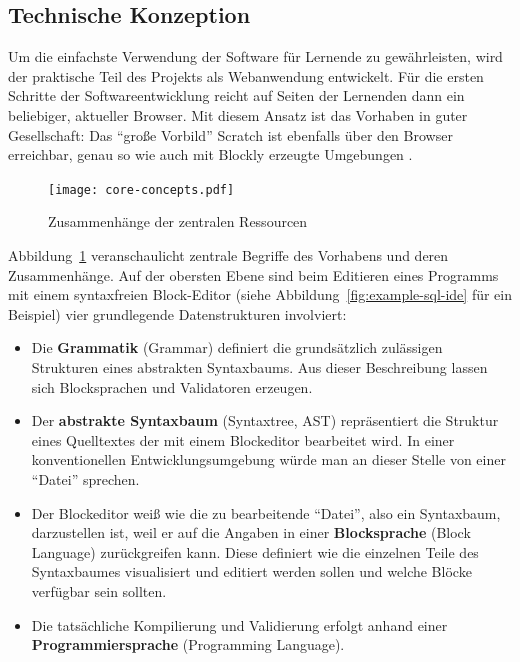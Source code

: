 \documentclass[paper=a4,fontsize=12pt,parskip=half]{scrartcl}
\begin{document}
\subsection{Technische Konzeption}

Um die einfachste Verwendung der Software für Lernende zu gewährleisten, wird der praktische Teil des Projekts als Webanwendung entwickelt. Für die ersten Schritte der Softwareentwicklung reicht auf Seiten der Lernenden dann ein beliebiger, aktueller Browser. Mit diesem Ansatz ist das Vorhaben in guter Gesellschaft: Das \enquote{große Vorbild} Scratch ist ebenfalls über den Browser erreichbar, genau so wie auch mit Blockly erzeugte Umgebungen \cite[vgl. S. 28]{riemer_blattwerkzeug_2016}.

\begin{figure}
  \texttt{[image: core-concepts.pdf]}
  \caption{Zusammenhänge der zentralen Ressourcen}
  \label{fig:core-relations}
\end{figure}

Abbildung~\ref{fig:core-relations} veranschaulicht zentrale Begriffe des Vorhabens und deren Zusammenhänge. Auf der obersten Ebene sind beim Editieren eines Programms mit einem syntaxfreien Block-Editor (siehe Abbildung~\ref{fig:example-sql-ide} für ein Beispiel) vier grundlegende Datenstrukturen involviert:

\begin{itemize}
\item Die \textbf{Grammatik} (Grammar) definiert die grundsätzlich zulässigen Strukturen eines abstrakten Syntaxbaums. Aus dieser Beschreibung lassen sich Blocksprachen und Validatoren erzeugen.
\item Der \textbf{abstrakte Syntaxbaum} (Syntaxtree, AST) repräsentiert die Struktur eines Quelltextes der mit einem Blockeditor bearbeitet wird. In einer konventionellen Entwicklungsumgebung würde man an dieser Stelle von einer \enquote{Datei} sprechen.
\item Der Blockeditor weiß wie die zu bearbeitende \enquote{Datei}, also ein Syntaxbaum, darzustellen ist, weil er auf die Angaben in einer \textbf{Blocksprache} (Block Language) zurückgreifen kann. Diese definiert wie die einzelnen Teile des Syntaxbaumes visualisiert und editiert werden sollen und welche Blöcke verfügbar sein sollten.
\item Die tatsächliche Kompilierung und Validierung erfolgt anhand einer \textbf{Programmiersprache} (Programming Language).
\end{itemize}
\end{document}
